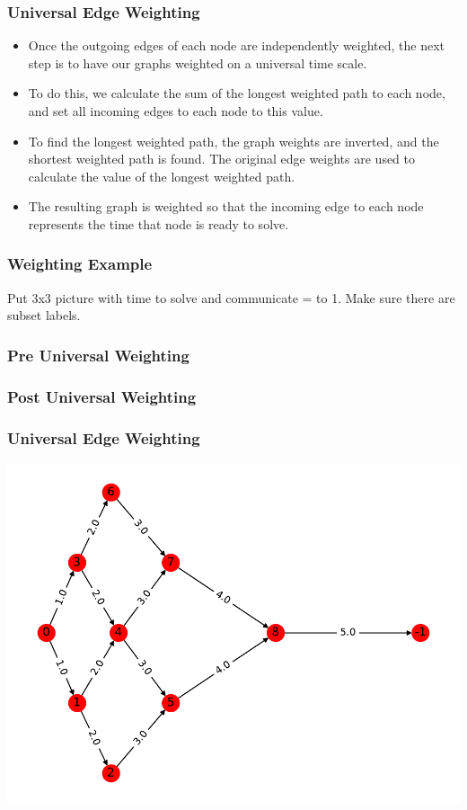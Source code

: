 \documentclass[xcolor={usenames,dvipsnames,svgnames,table}]{beamer}
\begin{document}
\begin{frame}[t]\frametitle{Universal Edge Weighting}
  \begin{block}{}
    \begin{itemize}
      \item Once the outgoing edges of each node are independently weighted, the next step is to have our graphs weighted on a universal time scale. 
      \item To do this, we calculate the sum of the longest weighted path to each node, and set all incoming edges to each node to this value.
      \item To find the longest weighted path, the graph weights are inverted, and the shortest weighted path is found. The original edge weights are used to calculate the value of the longest weighted path.
      \item The resulting graph is weighted so that the incoming edge to each node represents the time that node is ready to solve.
    \end{itemize}
  \end{block}
\end{frame}

\begin{frame}[t]\frametitle{Weighting Example}
Put 3x3 picture with time to solve and communicate = to 1. Make sure there are subset labels.
\end{frame}

\begin{frame}[t]\frametitle{Pre Universal Weighting}

\end{frame}

\begin{frame}[t]\frametitle{Post Universal Weighting}

\end{frame}

\begin{frame}[t]\frametitle{Universal Edge Weighting}
\centering
\includegraphics[scale=0.5]{figures/printgraph.pdf}
\end{frame}
\end{document}
